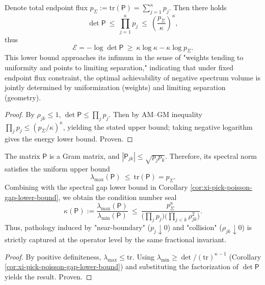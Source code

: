 \begin{corollary}\label{cor:xi-pick-poisson-energy-fixed-flux-extremal}
Denote total endpoint flux \(p_\Sigma:=\mathrm{tr}(\mathsf P)=\sum_{j=1}^{\kappa}p_j\).
Then there holds
\[
\boxed{\;
\det\mathsf P\ \le\ \prod_{j=1}^{\kappa}p_j\ \le\ \left(\frac{p_\Sigma}{\kappa}\right)^{\kappa},\;}
\]
thus
\[
\boxed{\;
\mathcal{E}=-\log\det\mathsf P\ \ge\ \kappa\log\kappa-\kappa\log p_\Sigma.\;}
\]
This lower bound approaches its infimum in the sense of "weights tending to uniformity and points to limiting separation," indicating that under fixed endpoint flux constraint, the optimal achievability of negative spectrum volume is jointly determined by uniformization (weights) and limiting separation (geometry).
\end{corollary}
\begin{proof}
By \(\rho_{jk}\le 1\), \(\det\mathsf P\le \prod_j p_j\).
Then by AM--GM inequality \(\prod_j p_j\le (p_\Sigma/\kappa)^\kappa\), yielding the stated upper bound;
taking negative logarithm gives the energy lower bound. Proven.
\end{proof}

\begin{corollary}\label{cor:xi-pick-poisson-condition-number-certificate}
The matrix \(\mathsf P\) is a Gram matrix, and \(|\mathsf P_{jk}|\le \sqrt{p_jp_k}\).
Therefore, its spectral norm satisfies the uniform upper bound
\[
\boxed{\;
\lambda_{\max}(\mathsf P)\ \le\ \mathrm{tr}(\mathsf P)=p_\Sigma.\;}
\]
Combining with the spectral gap lower bound in Corollary \ref{cor:xi-pick-poisson-gap-lower-bound}, we obtain the condition number seal
\[
\boxed{\;
\kappa(\mathsf P):=\frac{\lambda_{\max}(\mathsf P)}{\lambda_{\min}(\mathsf P)}
\ \le\
\frac{p_\Sigma^{\kappa}}{\bigl(\prod_{j}p_j\bigr)\bigl(\prod_{j<k}\rho_{jk}^2\bigr)}.\;}
\]
Thus, pathology induced by "near-boundary" (\(p_j\downarrow 0\)) and "collision" (\(\rho_{jk}\downarrow 0\)) is strictly captured at the operator level by the same fractional invariant.
\end{corollary}
\begin{proof}
By positive definiteness, \(\lambda_{\max}\le \mathrm{tr}\).
Using \(\lambda_{\min}\ge \det/(\mathrm{tr})^{\kappa-1}\) (Corollary \ref{cor:xi-pick-poisson-gap-lower-bound}) and substituting the factorization of \(\det\mathsf P\) yields the result. Proven.
\end{proof}

